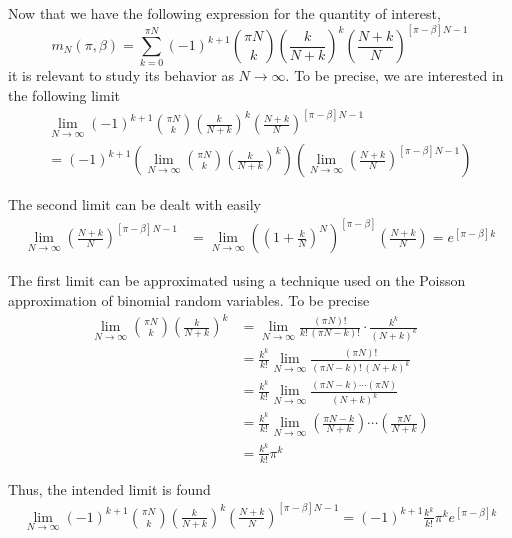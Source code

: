 \documentclass{article}
\newcommand{\ppar}[1]{\left( #1 \right)}
\newcommand{\spar}[1]{\left[ #1 \right]}
\begin{document}
Now that we have the following expression for the quantity of interest,
\begin{equation}
    m_N(\pi, \beta) =
    \sum_{k=0}^{\pi N}
    (-1)^{k+1} 
    \binom{\pi N}{k}
    \ppar{\frac{k}{N+k}}^k
    \ppar{\frac{N+k}{N}}^{\spar{\pi-\beta} N -1}
\end{equation}
it is relevant to study its behavior as $N\rightarrow \infty$. 
%
To be precise, we are interested in the following limit
\begin{multline}
    \lim_{N \rightarrow \infty}
    (-1)^{k+1} 
    \binom{\pi N}{k}
    \ppar{\frac{k}{N+k}}^k
    \ppar{\frac{N+k}{N}}^{\spar{\pi-\beta} N -1}
    \\
    =
    (-1)^{k+1}
    \ppar{\lim_{N \rightarrow \infty}
    \binom{\pi N}{k}
    \ppar{\frac{k}{N+k}}^k}
    \ppar{\lim_{N \rightarrow \infty}
    \ppar{\frac{N+k}{N}}^{\spar{\pi-\beta} N -1}}
\end{multline}

The second limit can be dealt with easily
\begin{align*}
    \lim_{N \rightarrow \infty}
    \ppar{\frac{N+k}{N}}^{\spar{\pi-\beta} N -1}
    &=
    \lim_{N \rightarrow \infty}
    \ppar{\ppar{1+\frac{k}{N}}^N}^{\spar{\pi - \beta}}
    \ppar{\frac{N+k}{N}}
    =
    e^{\spar{\pi - \beta}k}
\end{align*}

The first limit can be approximated using a technique used on the Poisson approximation of binomial random variables. 
%
To be precise
\begin{align*}
    \lim_{N \rightarrow \infty}
    \binom{\pi N}{k}
    \ppar{\frac{k}{N+k}}^k
    &=
    \lim_{N \rightarrow \infty}
    \frac{\ppar{\pi N}!}{k!\, \ppar{\pi N-k}!} \cdot 
    \frac{k^k}{\ppar{N+k}^k}
    \\
    &=
    \frac{k^k}{k!}
    \lim_{N \rightarrow \infty}
    \frac{\ppar{\pi N}!}{\ppar{\pi N-k}!\, \ppar{N+k}^k}
    \\
    &=
    \frac{k^k}{k!}
    \lim_{N \rightarrow \infty}
    \frac{\ppar{\pi N-k} \cdots \ppar{\pi N} }{\ppar{N+k}^k}
    \\
    &=
    \frac{k^k}{k!}
    \lim_{N \rightarrow \infty}
    \ppar{\frac{\pi N-k}{N+k}} \cdots \ppar{\frac{\pi N}{N+k}}
    \\
    &=
    \frac{k^k}{k!}
    \pi ^k
\end{align*}

Thus, the intended limit is found
\begin{multline}
    \lim_{N \rightarrow \infty}
    (-1)^{k+1} 
    \binom{\pi N}{k}
    \ppar{\frac{k}{N+k}}^k
    \ppar{\frac{N+k}{N}}^{\spar{\pi-\beta} N -1}
    =
    (-1)^{k+1}
    \frac{k^k}{k!}
    \pi ^k
    e^{\spar{\pi - \beta}k}
\end{multline}
\end{document}
